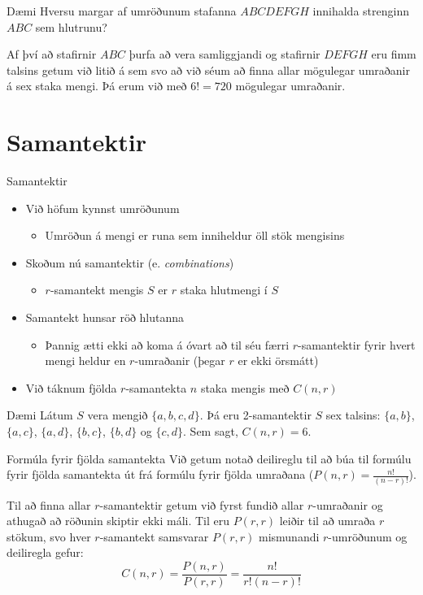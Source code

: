 \documentclass{beamer}
\begin{document}
\begin{frame}{Dæmi}
Hversu margar af umröðunum stafanna $ABCDEFGH$ innihalda strenginn $ABC$ sem hlutrunu? \pause

Af því að stafirnir $ABC$ þurfa að vera samliggjandi og stafirnir $DEFGH$ eru fimm talsins getum við litið á sem svo að við séum að finna allar mögulegar umraðanir á sex staka mengi. Þá erum við með $6! = 720$ mögulegar umraðanir.
\end{frame}

\section{Samantektir}

\begin{frame}{Samantektir}
\begin{itemize}
 \item Við höfum kynnst umröðunum
 \begin{itemize}
  \item Umröðun á mengi er runa sem inniheldur öll stök mengisins
 \end{itemize}
 \item Skoðum nú samantektir (e. \emph{combinations})
 \begin{itemize}
  \item $r$-samantekt mengis $S$ er $r$ staka hlutmengi í $S$
 \end{itemize}
 \item Samantekt hunsar röð hlutanna
 \begin{itemize}
  \item Þannig ætti ekki að koma á óvart að til séu færri $r$-samantektir fyrir hvert mengi heldur en $r$-umraðanir (þegar $r$ er ekki örsmátt)
 \end{itemize}
 \item Við táknum fjölda $r$-samantekta $n$ staka mengis með $C(n,r)$
\end{itemize}
\end{frame}

\begin{frame}{Dæmi}
Látum $S$ vera mengið $\{a, b, c, d\}$. Þá eru 2-samantektir $S$ sex talsins: $\{a, b\}$, $\{a, c\}$, $\{a, d\}$, $\{b, c\}$, $\{b, d\}$ og $\{c, d\}$. Sem sagt, $C(n, r) = 6$.
\end{frame}

\begin{frame}{Formúla fyrir fjölda samantekta}
Við getum notað deilireglu til að búa til formúlu fyrir fjölda samantekta út frá formúlu fyrir fjölda umraðana ($P(n,r) = \frac{n!}{(n-r)!}$).

Til að finna allar $r$-samantektir getum við fyrst fundið allar $r$-umraðanir og athugað að röðunin skiptir ekki máli. Til eru $P(r,r)$ leiðir til að umraða $r$ stökum, svo hver $r$-samantekt samsvarar $P(r,r)$ mismunandi $r$-umröðunum og deiliregla gefur:
\[
 C(n,r) = \frac{P(n,r)}{P(r,r)} = \frac{n!}{r!(n-r)!}
\]
\end{frame}
\end{document}
